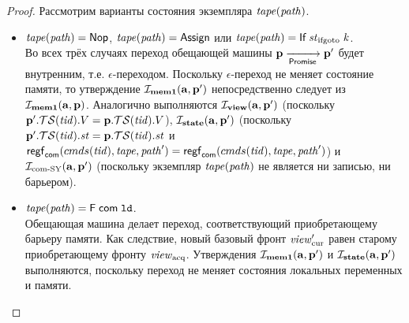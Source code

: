 \begin{proof}

Рассмотрим варианты состояния экземпляра $\mathit{tape}(\mathit{path})$.
\begin{itemize}
  \item $\mathit{tape}(\mathit{path}) = \textsf{Nop}$, $\mathit{tape}(\mathit{path}) = \textsf{Assign}$ или $\tape(\cpath) = \tapeIfGoto{\IfState}{\z}$. \\
    Во всех трёх случаях переход обещающей машины $\mathbf{p} \xrightarrow[\mathsf{Promise}]{} \mathbf{p}'$ будет внутренним, т.е. $\epsilon$-переходом.
    Поскольку $\epsilon$-переход не меняет состояние памяти, то утверждение $\mathcal{I}_{\rm \bf mem1}(\mathbf{a}, \mathbf{p}')$ непосредственно
    следует из $\mathcal{I}_{\rm \bf mem1}(\mathbf{a}, \mathbf{p})$.
    Аналогично выполняются $\mathcal{I}_{\rm \bf view} (\mathbf{a}, \mathbf{p}')$ (поскольку $\mathbf{p}'.\mathcal{TS}(\mathit{tid}).V = \mathbf{p}.\mathcal{TS}(\mathit{tid}).V$),
    $\mathcal{I}_{\rm \bf state}(\mathbf{a}, \mathbf{p}')$ (поскольку $\mathbf{p}'.\mathcal{TS}(\mathit{tid}).\mathit{st} = \mathbf{p}.\mathcal{TS}(\mathit{tid}).\mathit{st}$ и
    $\mathsf{regf}_\mathsf{com}({cmds}(\mathit{tid}), \mathit{tape}, \mathit{path}') = \mathsf{regf}_\mathsf{com}({cmds}(\mathit{tid}), \mathit{tape}, \mathit{path}')$) и 
    $\mathcal{I}_{\textup{\rm com-SY}}(\mathbf{a}, \mathbf{p}')$ (поскольку экземпляр $\mathit{tape}(\mathit{path})$ не является ни записью, ни барьером).

  \item $\mathit{tape}(\mathit{path}) = \textsf{F} \; \mathsf{com} \; \mathtt{ld}$. \\
    Обещающая машина делает переход, соответствующий приобретающему барьеру памяти.
    Как следствие, новый базовый фронт $\mathit{view}_{\mathrm{cur}}'$ равен старому приобретающему фронту $\mathit{view}_{\mathrm{acq}}$.
    Утверждения $\mathcal{I}_{\rm \bf mem1}(\mathbf{a}, \mathbf{p}')$ и $\mathcal{I}_{\rm \bf state}(\mathbf{a}, \mathbf{p}')$ выполняются, поскольку
    переход не меняет состояния локальных переменных и памяти.


\end{itemize}
\end{proof}
